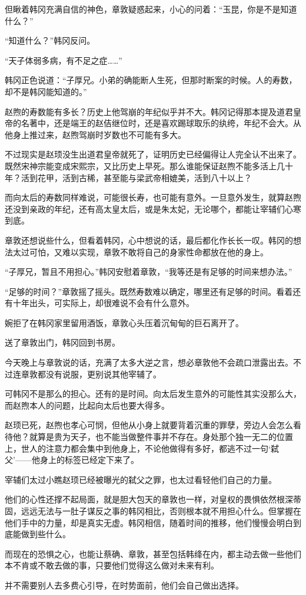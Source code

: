 但瞅着韩冈充满自信的神色，章敦疑惑起来，小心的问着：“玉昆，你是不是知道什么？”

“知道什么？”韩冈反问。

“天子体弱多病，有不足之症……”

韩冈正色说道：“子厚兄。小弟的确能断人生死，但那时断案的时候。人的寿数，却不是韩冈能知道的。”

赵煦的寿数能有多长？历史上他驾崩的年纪似乎并不大。韩冈记得那本提及道君皇帝的名著中，还是端王的赵佶继位时，还是喜欢踢球取乐的纨绔，年纪不会大。从他身上推过来，赵煦驾崩时岁数也不可能有多大。

不过现实是赵顼没生出道君皇帝就死了，证明历史已经偏得让人完全认不出来了。既然宋神宗能变成宋熙宗，又比历史上早死。那么谁能保证赵煦不能多活上几十年？活到花甲，活到古稀，甚至能与梁武帝相媲美，活到八十以上？

而向太后的寿数同样难说，可能很长寿，也可能有意外。一旦意外发生，就算赵煦还没到亲政的年纪，还有高太皇太后，或是朱太妃，无论哪个，都能让宰辅们心寒到底。

章敦还想说些什么，但看着韩冈，心中想说的话，最后都化作长长一叹。韩冈的想法太过可怕，又难以实现，章敦不敢将自己的身家性命都放在他的身上。

“子厚兄，暂且不用担心。”韩冈安慰着章敦，“我等还是有足够的时间来想办法。”

“足够的时间？”章敦摇了摇头。既然寿数难以确定，哪里还有足够的时间。看着还有十年出头，可实际上，却很难说不会有什么意外。

婉拒了在韩冈家里留用酒饭，章敦心头压着沉甸甸的巨石离开了。

送了章敦出门，韩冈回到书房。

今天晚上与章敦说的话，充满了太多大逆之言，想必章敦他不会疏口泄露出去。不过连章敦都没有说服，更别说其他宰辅了。

可韩冈不是那么的担心。还有的是时间。向太后发生意外的可能性其实没那么大，而赵煦本人的问题，比起向太后也要大得多。

赵顼已死，赵煦也孝心可悯，但他从小身上就要背着沉重的罪孽，旁边人会怎么看待他？就算是贵为天子，也不能当做整件事并不存在。身处那个独一无二的位置上，世人的注意力都会集中到他身上，不论他做得有多好，都逃不过一句‘弑父’——他身上的标签已经定下来了。

宰辅们太过小瞧赵顼已经被曝光的弑父之罪，也太过看轻他们自己的力量。

他们的心性还撑不起局面，就是胆大包天的章敦也一样，对皇权的畏惧依然根深蒂固，远远无法与一肚子谋反之事的韩冈相比，否则根本就不用担心什么。但掌握在他们手中的力量，却是真实无虚。韩冈相信，随着时间的推移，他们慢慢会明白到底能做到些什么。

而现在的恐惧之心，也能让蔡确、章敦，甚至包括韩绛在内，都主动去做一些他们本不肯或不敢去做的事，只要他们觉得这么做对未来有利。

并不需要别人去多费心引导，在时势面前，他们会自己做出选择。

